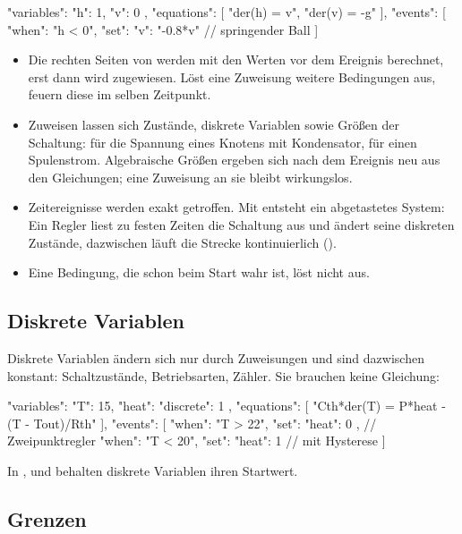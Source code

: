 \begin{json}
"variables": { "h": 1, "v": 0 },
"equations": [ "der(h) = v", "der(v) = -g" ],
"events": [
  { "when": "h < 0", "set": { "v": "-0.8*v" } }      // springender Ball
]
\end{json}

\begin{itemize}
  \item Die rechten Seiten von  werden mit den Werten vor dem
    Ereignis berechnet, erst dann wird zugewiesen. Löst eine Zuweisung
    weitere Bedingungen aus, feuern diese im selben Zeitpunkt.
  \item Zuweisen lassen sich Zustände, diskrete Variablen sowie Größen der
    Schaltung:  für die Spannung eines Knotens mit
    Kondensator,  für einen Spulenstrom. Algebraische Größen
    ergeben sich nach dem Ereignis neu aus den Gleichungen; eine Zuweisung
    an sie bleibt wirkungslos.
  \item Zeitereignisse werden exakt getroffen. Mit  entsteht
    ein abgetastetes System: Ein Regler liest zu festen Zeiten die
    Schaltung aus und ändert seine diskreten Zustände, dazwischen läuft die
    Strecke kontinuierlich ().
  \item Eine Bedingung, die schon beim Start wahr ist, löst nicht aus.
\end{itemize}

\subsection*{Diskrete Variablen}

Diskrete Variablen ändern sich nur durch Zuweisungen und sind dazwischen
konstant: Schaltzustände, Betriebsarten, Zähler. Sie brauchen keine
Gleichung:

\begin{json}
"variables": { "T": 15, "heat": { "discrete": 1 } },
"equations": [ "Cth*der(T) = P*heat - (T - Tout)/Rth" ],
"events": [
  { "when": "T > 22", "set": { "heat": 0 } },         // Zweipunktregler
  { "when": "T < 20", "set": { "heat": 1 } }          // mit Hysterese
]
\end{json}

In ,  und  behalten diskrete Variablen ihren
Startwert.

\subsection*{Grenzen}

